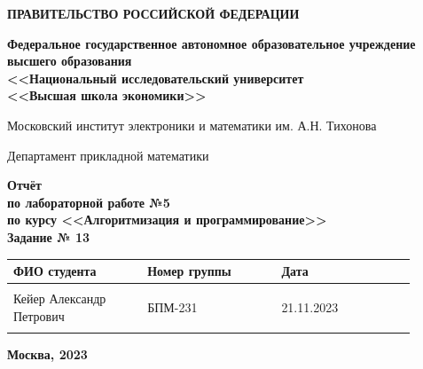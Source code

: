 \documentclass[12pt]{article}
\begin{document}
	
	\thispagestyle{empty}
	\begin{center}
		\textbf{ПРАВИТЕЛЬСТВО РОССИЙСКОЙ ФЕДЕРАЦИИ}
		
		\vspace{5ex}
		
		\textbf{Федеральное государственное автономное образовательное учреждение \\ высшего образования \\ <<Национальный исследовательский университет \\ <<Высшая школа экономики>>}
	\end{center}
	\vspace{5ex}
	
	\begin{center}
		Московский институт электроники и математики им. А.Н. Тихонова  
		
		\vspace{5ex}
		
		Департамент прикладной математики
		
		\vspace{10ex}
		\textbf{Отчёт \\ по лабораторной работе №5 \\ по курсу <<Алгоритмизация и программирование>> \\ Задание № 13}
		\vspace{7ex}
		
	\end{center}
	
	\begin{center} 
		\begin{tabular}{| p{0.3\linewidth}| p{0.3\linewidth}| p{0.3\linewidth}|}
			\hline	
			ФИО студента & Номер группы & Дата \\  \hline
			& & \\  
			Кейер Александр \newline Петрович & БПМ-231 & 21.11.2023\\  
			& & \\  \hline		
		\end{tabular}
	\end{center}
	
	\begin{center}
		\vspace{3ex}
		
		\vfill
		
		\normalsize
		
		\textbf{Москва, 2023}
	\end{center}
	
\end{document}
